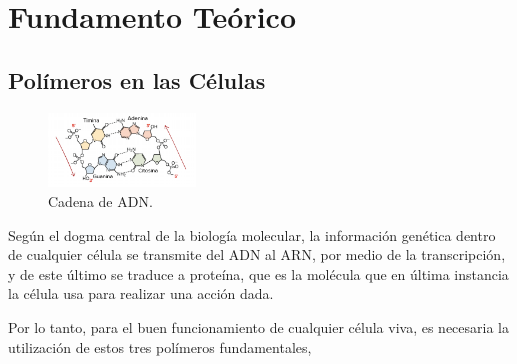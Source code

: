 \documentclass[a4paper,11pt,titlepage]{article}
\theoremstyle{definition}
\begin{document}

\section{Fundamento Teórico}\label{sec:thry}

\subsection{Polímeros en las Células}\label{subsec:polymers}

\begin{figure}
    \begin{center}
      \includegraphics[width=0.35\textwidth]{images/adn.png}
    \end{center}
    \caption{Cadena de ADN.}
    \label{fig:adnchain}
\end{figure}

Según el dogma central de la biología molecular, la información genética dentro de cualquier célula se transmite del ADN al ARN, por medio de la transcripción, y de este último se traduce a proteína, que es la molécula que en última instancia la célula usa para realizar una acción dada\cite{alberts}.

Por lo tanto, para el buen funcionamiento de cualquier célula viva, es necesaria la utilización de estos tres polímeros fundamentales,
\end{document}
